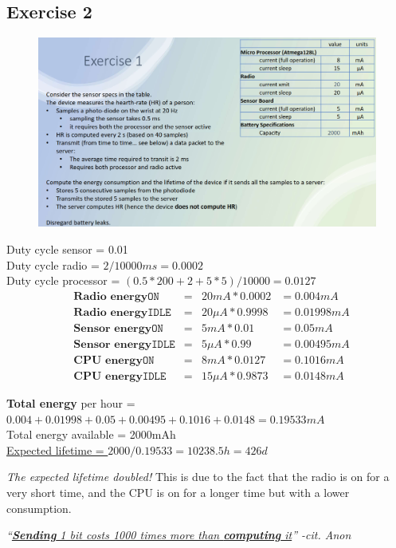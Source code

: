 \subsection*{Exercise 2}
\begin{figure}[htbp]
   \centering
   \includegraphics{images/energy_exercise2.png}
   \label{fig:energy_exercise2}
\end{figure}

Duty cycle sensor = 0.01\\
Duty cycle radio = $2 / 10000ms = 0.0002$\\
Duty cycle processor = $(0.5 * 200 + 2 + 5*5)/10000 = 0.0127$
\begin{align*}
   &\textbf{Radio energy} \texttt{ON} &=& 20mA * 0.0002 &= 0.004mA\\ 
   &\textbf{Radio energy} \texttt{IDLE} &=& 20\mu A * 0.9998 &= 0.01998mA\\
   &\textbf{Sensor energy} \texttt{ON} &=& 5mA *0.01 &= 0.05mA\\
   &\textbf{Sensor energy} \texttt{IDLE} &=& 5\mu A *0.99 &= 0.00495mA\\
   &\textbf{CPU energy} \texttt{ON} &=& 8mA * 0.0127 &= 0.1016mA\\
   &\textbf{CPU energy} \texttt{IDLE} &=& 15\mu A * 0.9873 &= 0.0148mA
\end{align*}

\textbf{Total energy} per hour =\\
$0.004 + 0.01998 + 0.05 + 0.00495 + 0.1016 + 0.0148 = 0.19533mA$\\
Total energy available = 2000mAh\\
\ul{Expected lifetime = $2000 / 0.19533 = 10238.5h = 426d$}

\textit{The expected lifetime doubled!} This is due to the fact that the radio is on for a very short time, and the CPU is on for a longer time but with a lower consumption.

\begin{center}
   \textit{``\ul{\textbf{Sending} 1 bit costs 1000 times more than \textbf{computing} it}'' -cit. Anon}
\end{center}